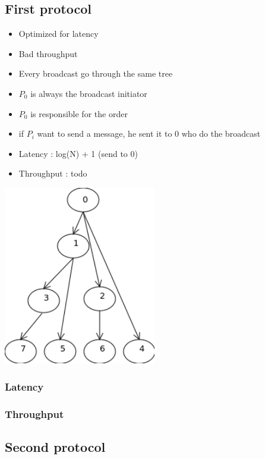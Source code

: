 \documentclass[a4paper]{article}
\begin{document}
        \subsection{First protocol}
        \begin{itemize}
            \item Optimized for latency
            \item Bad throughput
            \item Every broadcast go through the same tree
            \item $P_0$ is always the broadcast initiator
            \item $P_0$ is responsible for the order
            \item if $P_i$ want to send a message, he sent it to 0 who do the broadcast
            \item Latency : log(N) + 1 (send to 0)
            \item Throughput : todo
        \end{itemize}
        \includegraphics[width=0.5\textwidth]{latencyTO.png}

        \subsubsection{Latency}

        \subsubsection{Throughput}

        \subsection{Second protocol}
\end{document}
